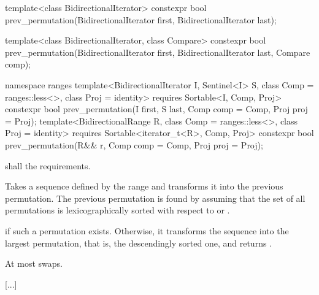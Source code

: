 %
\begin{itemdecl}
template<class BidirectionalIterator>
  constexpr bool prev_permutation(BidirectionalIterator first,
                                  BidirectionalIterator last);

template<class BidirectionalIterator, class Compare>
  constexpr bool prev_permutation(BidirectionalIterator first,
                                  BidirectionalIterator last, Compare comp);
\end{itemdecl}
\begin{addedblock}
\begin{itemdecl}
namespace ranges {
  template<BidirectionalIterator I, Sentinel<I> S, class Comp = ranges::less<>,
      class Proj = identity>
    requires Sortable<I, Comp, Proj>
    constexpr bool
      prev_permutation(I first, S last, Comp comp = Comp{}, Proj proj = Proj{});
  template<BidirectionalRange R, class Comp = ranges::less<>,
      class Proj = identity>
    requires Sortable<iterator_t<R>, Comp, Proj>
    constexpr bool
      prev_permutation(R&& r, Comp comp = Comp{}, Proj proj = Proj{});
}
\end{itemdecl}
\end{addedblock}

\begin{itemdescr}
\pnum
\requires
{}
 shall  the
 requirements.

\pnum
\effects
Takes a sequence defined by the range
and transforms it into the previous permutation.
The previous permutation is found by assuming that the set of all permutations is
lexicographically sorted with respect to
or  .

\pnum
\returns
{}
if such a permutation exists.
Otherwise, it transforms the sequence into the largest permutation,
that is, the descendingly sorted one, and returns
.

\pnum
\complexity
At most
swaps.
\end{itemdescr}

[...]
